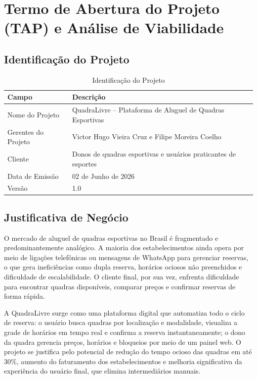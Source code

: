 \documentclass[12pt,a4paper,oneside]{report}
\begin{document}
\tableofcontents
\clearpage

\chapter{Termo de Abertura do Projeto (TAP) e Análise de Viabilidade}

\section{Identificação do Projeto}

\begin{table}[htbp]
\centering
\caption{Identificação do Projeto}
\begin{tabular}{p{5cm} p{9cm}}
\toprule
\textbf{Campo} & \textbf{Descrição} \\
\midrule
Nome do Projeto & QuadraLivre -- Plataforma de Aluguel de Quadras Esportivas \\
Gerentes do Projeto & Victor Hugo Vieira Cruz e Filipe Moreira Coelho \\
Cliente & Donos de quadras esportivas e usuários praticantes de esportes \\
Data de Emissão & 02 de Junho de 2026 \\
Versão & 1.0 \\
\bottomrule
\end{tabular}
\end{table}

\section{Justificativa de Negócio}

O mercado de aluguel de quadras esportivas no Brasil é fragmentado e predominantemente analógico. A maioria dos estabelecimentos ainda opera por meio de ligações telefônicas ou mensagens de WhatsApp para gerenciar reservas, o que gera ineficiências como dupla reserva, horários ociosos não preenchidos e dificuldade de escalabilidade. O cliente final, por sua vez, enfrenta dificuldade para encontrar quadras disponíveis, comparar preços e confirmar reservas de forma rápida.

A QuadraLivre surge como uma plataforma digital que automatiza todo o ciclo de reserva: o usuário busca quadras por localização e modalidade, visualiza a grade de horários em tempo real e confirma a reserva instantaneamente; o dono da quadra gerencia preços, horários e bloqueios por meio de um painel web. O projeto se justifica pelo potencial de redução do tempo ocioso das quadras em até 30\%, aumento do faturamento dos estabelecimentos e melhoria significativa da experiência do usuário final, que elimina intermediários manuais.
\end{document}

